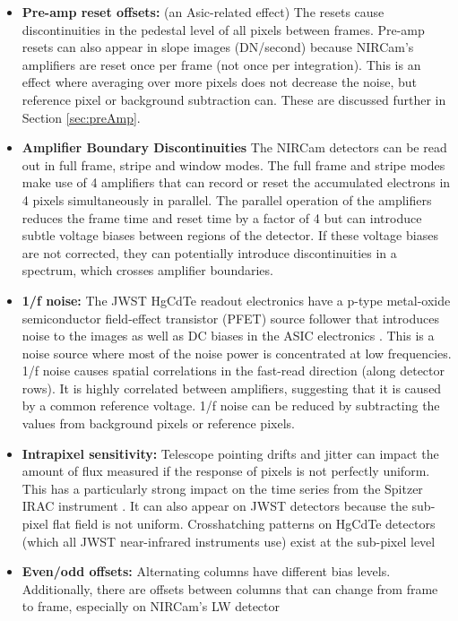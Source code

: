 \documentclass{aastex62}
\begin{document}
\begin{itemize}[noitemsep]
	\item \textbf{Pre-amp reset offsets:} (an Asic-related effect) 
The resets cause discontinuities in the pedestal level of all pixels between frames.
Pre-amp resets can also appear in slope images (DN/second) because NIRCam's amplifiers are reset once per frame (not once per integration).
This is an effect where averaging over more pixels does not decrease the noise, but reference pixel or background subtraction can.
These are discussed further in Section \ref{sec:preAmp}.
	\item \textbf{Amplifier Boundary Discontinuities} The NIRCam detectors can be read out in full frame, stripe and window modes. The full frame and stripe modes make use of 4 amplifiers that can record or reset the accumulated electrons in 4 pixels simultaneously in parallel. The parallel operation of the amplifiers reduces the frame time and reset time by a factor of 4 but can introduce subtle voltage biases between regions of the detector. If these voltage biases are not corrected, they can potentially introduce discontinuities in a spectrum, which crosses amplifier boundaries.
	\item \textbf{1/f noise:} The JWST HgCdTe readout electronics have a p-type metal-oxide semiconductor field-effect transistor (PFET) source follower that introduces noise to the images as well as DC biases in the ASIC electronics \citep{rauscher2011irsSquared}.
	This is a noise source where most of the noise power is concentrated at low frequencies.
	1/f noise causes spatial correlations in the fast-read direction (along detector rows). It is highly correlated between amplifiers, suggesting that it is caused by a common reference voltage. 1/f noise can be reduced by subtracting the values from background pixels or reference pixels.
	\item \textbf{Intrapixel sensitivity:} Telescope pointing drifts and jitter can impact the amount of flux measured if the response of pixels is not perfectly uniform.
	This has a particularly strong impact on the time series from the Spitzer IRAC instrument \citep{ingalls2016spitzerRepeatability}.
	It can also appear on JWST detectors because the sub-pixel flat field is not uniform.
	Crosshatching patterns on HgCdTe detectors (which all JWST near-infrared instruments use) exist at the sub-pixel level  \citep{shapiro2018crosshatch,ninan2019crosshatchHPF}
	\item \textbf{Even/odd offsets:} Alternating columns have different bias levels. Additionally, there are offsets between columns that can change from frame to frame, especially on NIRCam's LW detector

\end{itemize}
\end{document}
